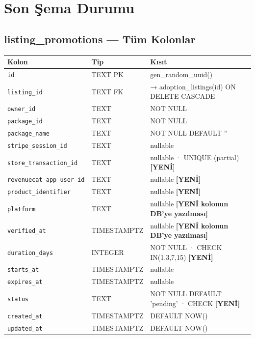 \documentclass[12pt,a4paper]{article}
\begin{document}
\section{Son Şema Durumu}

\subsection{listing\_promotions — Tüm Kolonlar}

\begin{center}
\begin{tabular}{lll}
  \toprule
  \textbf{Kolon} & \textbf{Tip} & \textbf{Kısıt}\\
  \midrule
  \texttt{id}                      & TEXT PK   & gen\_random\_uuid()\\
  \texttt{listing\_id}             & TEXT FK   & → adoption\_listings(id) ON DELETE CASCADE\\
  \texttt{owner\_id}               & TEXT      & NOT NULL\\
  \texttt{package\_id}             & TEXT      & NOT NULL\\
  \texttt{package\_name}           & TEXT      & NOT NULL DEFAULT ''\\
  \texttt{stripe\_session\_id}     & TEXT      & nullable\\
  \texttt{store\_transaction\_id}  & TEXT      & nullable · UNIQUE (partial) \textbf{[YENİ]}\\
  \texttt{revenuecat\_app\_user\_id} & TEXT    & nullable \textbf{[YENİ]}\\
  \texttt{product\_identifier}     & TEXT      & nullable \textbf{[YENİ]}\\
  \texttt{platform}                & TEXT      & nullable \textbf{[YENİ kolonun DB'ye yazılması]}\\
  \texttt{verified\_at}            & TIMESTAMPTZ & nullable \textbf{[YENİ kolonun DB'ye yazılması]}\\
  \texttt{duration\_days}          & INTEGER   & NOT NULL · CHECK IN(1,3,7,15) \textbf{[YENİ]}\\
  \texttt{starts\_at}              & TIMESTAMPTZ & nullable\\
  \texttt{expires\_at}             & TIMESTAMPTZ & nullable\\
  \texttt{status}                  & TEXT      & NOT NULL DEFAULT 'pending' · CHECK \textbf{[YENİ]}\\
  \texttt{created\_at}             & TIMESTAMPTZ & DEFAULT NOW()\\
  \texttt{updated\_at}             & TIMESTAMPTZ & DEFAULT NOW()\\
  \bottomrule
\end{tabular}
\end{center}
\end{document}
